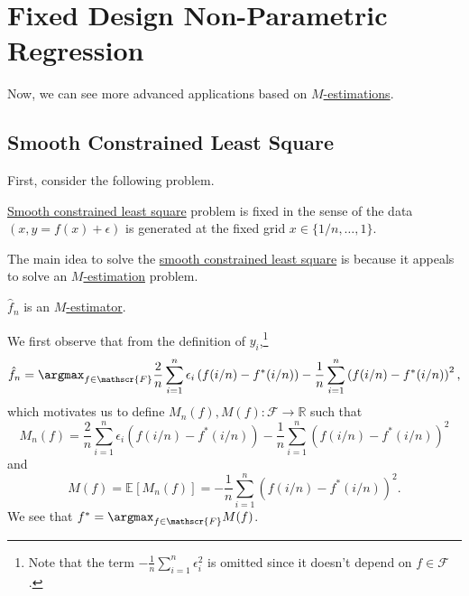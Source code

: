 \section{Fixed Design Non-Parametric Regression}
Now, we can see more advanced applications based on \hyperref[prb:M-estimation]{\(M\)-estimations}.

\subsection{Smooth Constrained Least Square}
First, consider the following problem.


\begin{notation}
	\hyperref[prb:smooth-LS]{Smooth constrained least square} problem is fixed in the sense of the data \((x, y = f(x) + \epsilon )\) is generated at the fixed grid \(x\in \{ 1 / n, \dots , 1 \} \).
\end{notation}

The main idea to solve the \hyperref[prb:smooth-LS]{smooth constrained least square} is because it appeals to solve an \hyperref[prb:M-estimation]{\(M\)-estimation} problem.

\begin{remark}
	\(\hat{f} _n \) is an \hyperref[prb:M-estimation]{\(M\)-estimator}.
\end{remark}
\begin{explanation}
	We first observe that from the definition of \(y_i\),\footnote{Note that the term \(-\frac{1}{n} \sum_{i=1}^{n} \epsilon _i ^2\) is omitted since it doesn't depend on \(f \in \mathscr{F} \).}
	\[
		\hat{f} _n = \argmax_{f\in \mathscr{F} } \frac{2}{n} \sum_{i=1}^{n} \epsilon _i \left( f (i / n) - f^{\ast} (i / n)  \right) - \frac{1}{n} \sum_{i=1}^{n} \left( f (i / n) - f^{\ast} (i / n) \right) ^2 ,
	\]
	which motivates us to define \(M_n(f) , M(f) \colon \mathscr{F} \to \mathbb{R} \) such that
	\[
		M_n(f) = \frac{2}{n} \sum_{i=1}^{n} \epsilon _i \left( f (i / n) - f^{\ast} (i / n)  \right) - \frac{1}{n} \sum_{i=1}^{n} \left( f (i / n) - f^{\ast} (i / n) \right) ^2
	\]
	and
	\[
		M(f)
		= \mathbb{E}_{}\left[M_n (f) \right]
		= - \frac{1}{n} \sum_{i=1}^{n} \left( f (i / n) - f^{\ast} (i / n) \right) ^2.
	\]
	We see that \(f^{\ast} = \argmax_{f\in \mathscr{F} } M(f) \).
\end{explanation}


